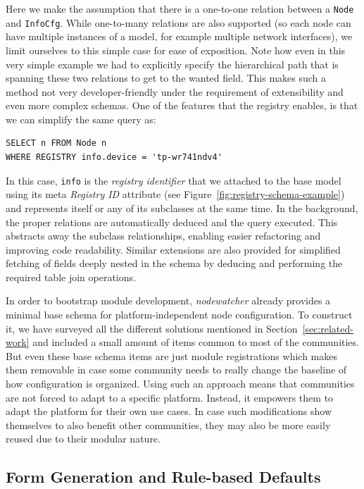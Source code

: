 \documentclass[5p,sort&compress]{elsarticle}
\newcommand{\nodewatcher}{\textit{nodewatcher}}
\begin{document}
Here we make the assumption that there is a one-to-one relation between a \texttt{Node} and \texttt{InfoCfg}.
While one-to-many relations are also supported (so each node can have multiple instances of a model, for example multiple network interfaces), we limit ourselves to this simple case for ease of exposition.
Note how even in this very simple example we had to explicitly specify the hierarchical path that is spanning these two relations to get to the wanted field.
This makes such a method not very developer-friendly under the requirement of extensibility and even more complex schemas.
One of the features that the registry enables, is that we can simplify the same query as:
\begin{verbatim}
SELECT n FROM Node n
WHERE REGISTRY info.device = 'tp-wr741ndv4'
\end{verbatim}

In this case, \texttt{info} is the \textit{registry identifier} that we attached to the base model using its meta \textit{Registry ID} attribute (see Figure~\ref{fig:registry-schema-example}) and represents itself or any of its subclasses at the same time.
In the background, the proper relations are automatically deduced and the query executed.
This abstracts away the subclass relationships, enabling easier refactoring and improving code readability.
Similar extensions are also provided for simplified fetching of fields deeply nested in the schema by deducing and performing the required table join operations.

In order to bootstrap module development, \nodewatcher{} already provides a minimal base schema for platform-independent node configuration.
To construct it, we have surveyed all the different solutions mentioned in Section~\ref{sec:related-work} and included a small amount of items common to most of the communities.
But even these base schema items are just module registrations which makes them removable in case some community needs to really change the baseline of how configuration is organized.
Using such an approach means that communities are not forced to adapt to a specific platform.
Instead, it empowers them to adapt the platform for their own use cases.
In case such modifications show themselves to also benefit other communities, they may also be more easily reused due to their modular nature.

\subsection{Form Generation and Rule-based Defaults}
\label{sec:form-generation}
\end{document}
